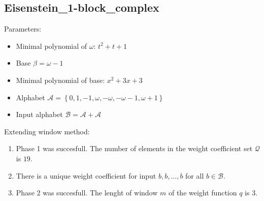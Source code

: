 \subsection{ Eisenstein\_1-block\_complex }

\label{subsec:Eisenstein1-blockcomplex}

Parameters:
\begin{itemize}
    \item Minimal polynomial of $\omega$: $ t^{2} + t + 1 $
    \item Base $\beta= \omega - 1 $
    \item Minimal polynomial of base: $ x^{2} + 3x + 3 $
    \item Alphabet $\mathcal{A} =\left\{0, 1, -1, \omega, -\omega, -\omega - 1, \omega + 1\right\}$
    \item Input alphabet $\mathcal{B} =\mathcal{A}+ \mathcal{A}$
\end{itemize}


\noindent Extending window method:
\begin{enumerate}
    \item Phase 1 was succesfull.
The number of elements in the weight coefficient set $\mathcal{Q}$ is $19$.

    \item There is a unique weight coefficient for input $b,b,\dots,b$ for all $b\in\mathcal{B}$.

    \item Phase 2 was succesfull.
The lenght of window $m$ of the weight function $q$ is 3.
\end{enumerate}
